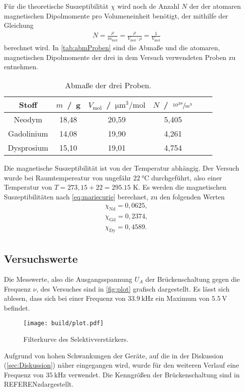 \noindent
Für die theoretische Suszeptibilität $\chi$ wird noch de Anzahl $N$ der der atomaren magnetischen Dipolmomente pro Volumeneinheit benötigt, der mithilfe der Gleichung 
\begin{align*}
  N = \frac{\rho}{m_{\text{mol}}} = \frac{\rho}{V_{\text{mol}} \cdot \rho} = \frac{1}{V_{\text{mol}}} %
\end{align*}
berechnet wird.
In \autoref{tab:abmProben} sind die Abmaße und die atomaren, magnetischen Dipolmomente der drei in dem Versuch verwendeten Proben zu entnehmen.
\begin{table}[H]
  \centering
  \caption{Abmaße der drei Proben.}
  \label{tab:abmProben}
  \begin{tabular}{c| c c c c c}
    \toprule
    Stoff & $m$ \,/\, g & $V_{\text{mol}}$ \,/\, $\si{\micro\cubic\meter\per\mole}$ & $N$ \,/\, $\sfrac{10^{29}}{\si{\cubic\meter}}$ \\
    \midrule
    Neodym & 18,48  & 20,59 & 5,405 \\
    Gadolinium & 14,08 & 19,90 & 4,261 \\
    Dysprosium & 15,10 & 19,01 & 4,754 \\
    \bottomrule
  \end{tabular}
\end{table}

\noindent
Die magnetische Suszeptibilität ist von der Temperatur abhängig. Der Versuch wurde bei Raumtempereatur von ungefähr $\SI{22}{\degreeCelsius}$ durchgeführt, also einer Temperatur von $T = 273,15 + 22 = 295.15$ K.
Es werden die magnetischen Suszeptibilitäten nach \autoref{eq:mariecurie} berechnet, zu den folgenden Werten
\begin{align*}
  \chi_{\text{Nd}} = 0,0625,  \\
  \chi_{\text{Gd}} = 0,2374, \\
  \chi_{\text{Dy}} = 0,4589. \\
\end{align*}






\subsection{Versuchswerte}
\label{subsec:versuchsW}
Die Messwerte, also die Ausgangsspannung $U_A$ der Brückenschaltung gegen die Frequenz $\nu$, des Versuches sind in \autoref{fig:plot} grafisch dargestellt.
Es lässt sich ablesen, dass sich bei einer Frequenz von $\SI{33,9}{\kilo\hertz}$ ein Maximum von $\SI{5,5}{\volt}$ befindet. 
\begin{figure}[H]
  \centering
  \texttt{[image: build/plot.pdf]}
  \caption{Filterkurve des Selektivverstärkers.}
  \label{fig:plot}
\end{figure}
Aufgrund von hohen Schwankungen der Geräte, auf die in der Diskussion (\autoref{sec:Diskussion}) näher eingegangen wird, wurde für den weiteren Verlauf eine Frequenz von $\SI{35}{\kilo\hertz}$ verwendet.
Die Kenngrößen der Brückenschaltung sind in {REFERENz}dargestellt. 

